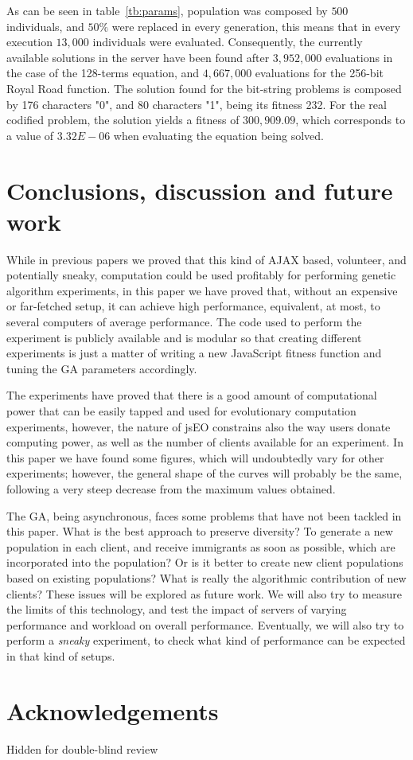 \documentclass[runningheads,a4paper]{llncs}
\begin{document}
As can be seen in table~\ref{tb:params}, population was composed by $500$ individuals, and $50\%$ were replaced in every generation, this means that in every execution $13,000$ individuals were evaluated. Consequently, the currently available solutions in the server have been found after $3,952,000$ evaluations in the case of the 128-terms equation, and $4,667,000$ evaluations for the 256-bit Royal Road function. The solution found for the bit-string problems is composed by 176 characters "0", and 80 characters "1", being  its fitness 232. For the real codified problem, the solution yields a fitness of $300,909.09$, which corresponds to a value of $3.32E-06$ when evaluating the equation being solved.

\section{Conclusions, discussion and future work}
\label{sec:conc}

While in previous papers  we proved that
this kind of AJAX based, volunteer, and potentially sneaky,
computation could be used profitably for performing genetic algorithm
experiments, in this paper we have proved that, 
without an expensive or far-fetched setup, it can achieve high
performance, equivalent, at most, to several computers of average
performance. The code used to perform the experiment is publicly
available and is modular so that creating different experiments is
just a matter of writing a new JavaScript fitness function and tuning
the GA parameters accordingly. 

The experiments have proved that there is a good amount of
computational power that can be easily tapped and used for
evolutionary computation experiments, however, the nature of jsEO
constrains also the way users donate computing power, as well as the
number of clients available for an experiment. In this paper we have
found some figures, which will undoubtedly vary for other experiments;
however, the general shape of the curves will probably be the same,
following a very steep decrease from the maximum values obtained. 

The GA, being asynchronous, faces some problems that have not been
tackled in this paper. What is the best approach to preserve
diversity? To generate a new population in each client, and receive
immigrants as soon as possible, which are incorporated into the
population? Or is it better to create new client populations based on
existing populations? What is really the algorithmic contribution of
new clients? These issues will be explored as future work. 
We will also try to measure the limits of this technology, and test
the impact of servers of varying performance and workload on overall
performance. Eventually, we will also try to perform a {\em sneaky}
experiment, to check what kind of performance can be expected in that
kind of setups. 

\section*{Acknowledgements}

Hidden for double-blind review





\end{document}
